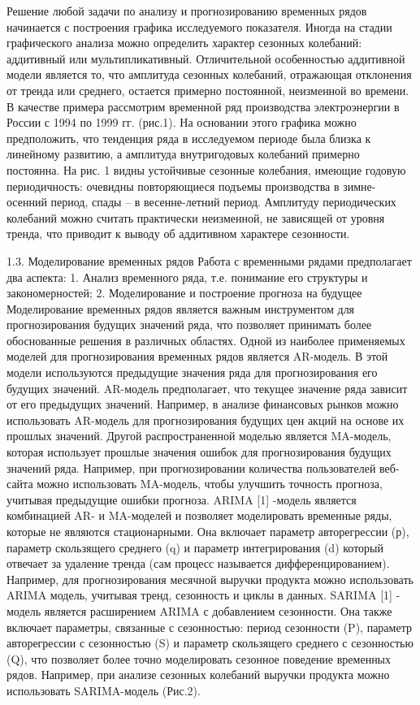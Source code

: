 Решение любой задачи по анализу и прогнозированию временных рядов начинается с построения графика исследуемого показателя. Иногда на стадии графического анализа можно определить характер сезонных колебаний: аддитивный или мультипликативный. Отличительной особенностью аддитивной модели является то, что амплитуда сезонных колебаний, отражающая отклонения от тренда или среднего, остается примерно постоянной, неизменной во времени.
В качестве примера рассмотрим временной ряд производства электроэнергии в России с 1994 по 1999 гг. (рис.1). 
На основании этого графика можно предположить, что тенденция ряда в исследуемом периоде была близка к линейному развитию, а амплитуда внутригодовых колебаний примерно постоянна. На рис. 1 видны устойчивые сезонные колебания, имеющие годовую периодичность: очевидны повторяющиеся подъемы производства в зимне-осенний период, спады – в весенне-летний период. Амплитуду периодических колебаний можно считать практически неизменной, не зависящей от уровня тренда, что приводит к выводу об аддитивном характере сезонности.


1.3. Моделирование временных рядов
Работа с временными рядами предполагает два аспекта:
1.	Анализ временного ряда, т.е. понимание его структуры и закономерностей;
2.	Моделирование и построение прогноза на будущее 
Моделирование временных рядов является важным инструментом для прогнозирования будущих значений ряда, что позволяет принимать более обоснованные решения в различных областях.
Одной из наиболее применяемых моделей для прогнозирования временных рядов является AR-модель. В этой модели используются предыдущие значения ряда для прогнозирования его будущих значений. AR-модель предполагает, что текущее значение ряда зависит от его предыдущих значений. Например, в анализе финансовых рынков можно использовать AR-модель для прогнозирования будущих цен акций на основе их прошлых значений.
Другой распространенной моделью является MA-модель, которая использует прошлые значения ошибок для прогнозирования будущих значений ряда. Например, при прогнозировании количества пользователей веб-сайта можно использовать MA-модель, чтобы улучшить точность прогноза, учитывая предыдущие ошибки прогноза.
ARIMA [1] -модель является комбинацией AR- и MA-моделей и позволяет моделировать временные ряды, которые не являются стационарными. Она включает параметр авторегрессии (р), параметр скользящего среднего (q) и параметр интегрирования (d) который отвечает за удаление тренда (сам процесс называется дифференцированием). Например, для прогнозирования месячной выручки продукта можно использовать ARIMA модель, учитывая тренд, сезонность и циклы в данных.
SARIMA [1] - модель является расширением ARIMA с добавлением сезонности. Она также включает параметры, связанные с сезонностью: период сезонности (P), параметр авторегрессии с сезонностью (S) и параметр скользящего среднего с сезонностью (Q), что позволяет более точно моделировать сезонное поведение временных рядов. Например, при анализе сезонных колебаний выручки продукта можно использовать SARIMA-модель (Рис.2).
 
